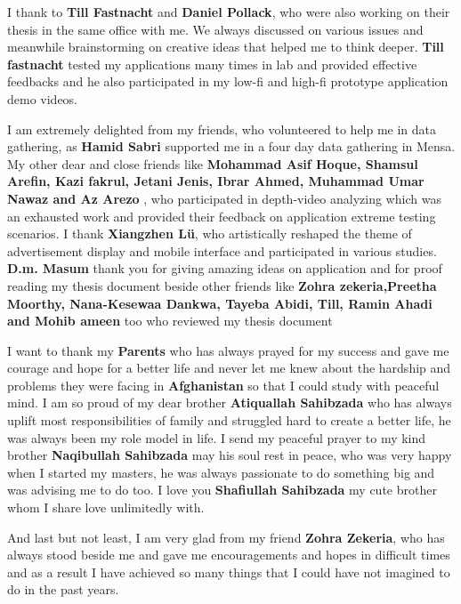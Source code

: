 \begin{acknowledgements}
I thank to \textbf{Till Fastnacht} and \textbf{Daniel Pollack}, who were also working on their thesis in the same office with me. We always discussed on various issues and meanwhile brainstorming on creative ideas that helped me to think deeper. \textbf{Till fastnacht} tested my applications many times in lab and provided effective feedbacks and he also participated in my low-fi and high-fi prototype application demo videos. 

I am extremely delighted from my friends, who volunteered to help me in data gathering, as \textbf{Hamid Sabri} supported me in a four day data gathering in Mensa. My other dear and close friends like \textbf{Mohammad Asif Hoque, Shamsul Arefin, Kazi fakrul, Jetani Jenis, Ibrar Ahmed, Muhammad Umar Nawaz and Az Arezo }, who participated in depth-video analyzing which was an exhausted work and provided their feedback on application extreme testing scenarios. I thank \textbf{Xiangzhen Lü}, who artistically reshaped the theme of advertisement display and mobile interface and participated in various studies. \textbf{D.m. Masum} thank you for giving amazing ideas on application and for proof reading my thesis document beside other friends like \textbf{Zohra zekeria,Preetha Moorthy, Nana-Kesewaa Dankwa, Tayeba Abidi, Till, Ramin Ahadi and Mohib ameen} too who reviewed my thesis document

I want to thank my \textbf{Parents} who has always prayed for my success and gave me courage and hope for a better life and never let me knew about the hardship and problems they were facing in \textbf{Afghanistan} so that I could study with peaceful mind. I am so proud of my dear brother \textbf{Atiquallah Sahibzada} who has always uplift most responsibilities of family and struggled hard to create a better life, he was always been my role model in life. I send my peaceful prayer to my kind brother \textbf{Naqibullah Sahibzada} may his soul rest in peace, who was very happy when I started my masters, he was always passionate to do something big and was advising me to do too. I love you \textbf{Shafiullah Sahibzada} my cute brother whom I share love unlimitedly with.

And last but not least, I am very glad from my friend \textbf{Zohra Zekeria}, who has always stood beside me and gave me encouragements and hopes in difficult times and as a result I have achieved so many things that I could have not imagined to do in the past years. 


\end{acknowledgements}
